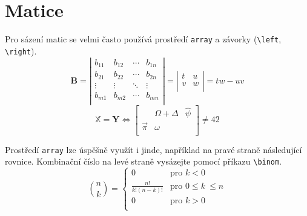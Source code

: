\documentclass[twocolumn,a4paper,11pt]{article}
\begin{document}
\section{Matice}
\label{sec:matice}
Pro sázení matic se velmi často používá prostředí \verb|array| a závorky (\verb|\left|, \verb|\right|).
\[
\mathbf{B} = \left|
\begin{array}{cccc}
    b_{11} & b_{12} & \cdots & b_{1n} \\
    b_{21} & b_{22} & \cdots & b_{2n} \\
    \vdots & \vdots & \ddots & \vdots \\
    b_{m1} & b_{m2} & \cdots & b_{mn} \\
\end{array}
\right|
= \left|\begin{array}{cc}
    t & u \\
    v & w \\
\end{array}
\right| = tw-uv
\]
\[
\mathbb{X} = \mathbf{Y} \Longleftrightarrow \left[
\begin{array}{ccc}
    & \Omega + \Delta & \hat{\psi} \\
    \vec{\pi} & \omega & \\
\end{array}
\right] \neq 42
\]
\par Prostředí \verb|array| lze úspěšně využít i jinde, například na pravé straně následující rovnice.
Kombinační číslo na levé straně vysázejte pomocí příkazu \verb|\binom|.
\[
\binom{n}{k} = \left\{ 
\begin{array}{cl}
    0 & \text{pro } k<0 \\
    \frac{n!}{k!(n-k)!} & \text{pro } 0\leq k~\leq n \\
    0 & \text{pro } k>0 \\
\end{array}
\right.
\]
\end{document}
